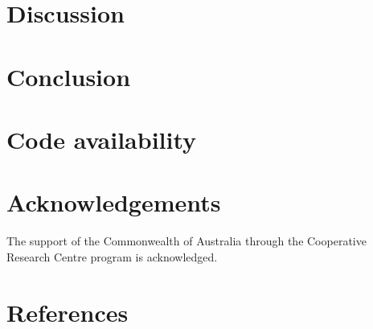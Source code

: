 \documentclass[final,3p,times,authoryear]{elsarticle}
\begin{document}
%
%
%



\section{Discussion}\label{sec:discussion}

\section{Conclusion}\label{sec:conclusion}





\section{Code availability}\label{sec:available}

\printglossary[title={List of Symbols}]

\section*{Acknowledgements}
The support of the Commonwealth of Australia through the Cooperative Research Centre program is acknowledged.

\section*{References}\label{sec:ref}
   
  


\begin{thebibliography}{00}


\bibitem[ ()]{}

\end{thebibliography}
\end{document}
